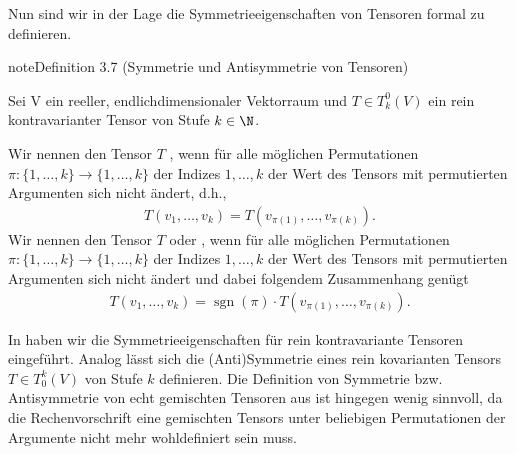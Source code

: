 \documentclass[letterpaper,10pt,german]{jupyterBook}
\begin{document}
\sphinxAtStartPar
Nun sind wir in der Lage die Symmetrieeigenschaften von Tensoren formal zu definieren.
\label{vektoranalysis/tensor:def:symmetrieTensor}
\begin{sphinxadmonition}{note}{Definition 3.7 (Symmetrie und Antisymmetrie von Tensoren)}



\sphinxAtStartPar
Sei V ein reeller, endlich\sphinxhyphen{}dimensionaler Vektorraum und \(T \in T_k^0(V)\) ein rein kontravarianter Tensor von Stufe \(k \in \N\).

\sphinxAtStartPar
Wir nennen den Tensor \(T\) , wenn für alle möglichen Permutationen \(\pi \colon \lbrace 1,\ldots, k\rbrace \rightarrow \lbrace 1,\ldots, k\rbrace\) der Indizes \(1,\ldots,k\) der Wert des Tensors mit permutierten Argumenten sich nicht ändert, d.h.,
\begin{equation*}
\begin{split}T(v_1, \ldots, v_k) = T(v_{\pi(1)}, \ldots, v_{\pi(k)}).\end{split}
\end{equation*}
\sphinxAtStartPar
Wir nennen den Tensor \(T\)  oder , wenn für alle möglichen Permutationen \(\pi \colon \lbrace 1,\ldots, k\rbrace \rightarrow \lbrace 1,\ldots, k\rbrace\) der Indizes \(1,\ldots,k\) der Wert des Tensors mit permutierten Argumenten sich  nicht ändert und dabei folgendem Zusammenhang genügt
\begin{equation*}
\begin{split}T(v_1, \ldots, v_k) = \operatorname{sgn}(\pi) \cdot T(v_{\pi(1)}, \ldots, v_{\pi(k)}).\end{split}
\end{equation*}\end{sphinxadmonition}

\sphinxAtStartPar
In {\hyperref[\detokenize{vektoranalysis/tensor:def:symmetrieTensor}]{}} haben wir die Symmetrieeigenschaften für rein kontravariante Tensoren eingeführt.
Analog lässt sich die (Anti\sphinxhyphen{})Symmetrie eines rein kovarianten Tensors \(T \in T^k_0(V)\) von Stufe \(k\) definieren.
Die Definition von Symmetrie bzw. Antisymmetrie von echt gemischten Tensoren aus {\hyperref[\detokenize{vektoranalysis/tensor:def:gemischteTensoren}]{}} ist hingegen wenig sinnvoll, da die Rechenvorschrift eine gemischten Tensors unter beliebigen Permutationen der Argumente nicht mehr wohldefiniert sein muss.
\end{document}
